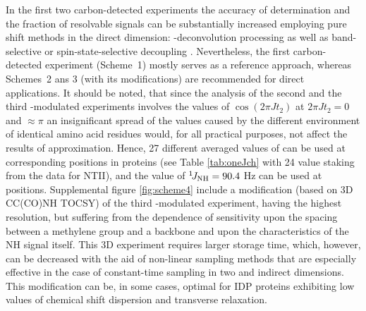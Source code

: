 \documentclass[twocolumn]{svjour3}           %
\begin{document}
In the first two carbon-detected experiments the accuracy of \gtwoCH{} determination and the fraction of resolvable signals can be substantially increased employing pure shift methods in the direct \clab{} dimension: \oneJcc-decon\-volution processing \cite{shimba_elimination_2003,kazimierczuk_non-uniform_2015} as well as band-selective or spin-state-selective decoupling \cite{zangger_pure_2015}. Nevertheless, the first carbon-detected experiment (Scheme~1) mostly serves as a reference approach, whereas Schemes~2 ans 3 (with its modifications) are recommended for direct applications. It should be noted, that since the analysis of the second and the third \oneJch-modulated 
experiments involves the values of $\cos(2\pi J t_2)$  at 
$2\pi J t_2 = 0$ and $\approx \pi$ an insignificant 
spread of the \oneJch{} values caused by the different environment of 
identical amino acid residues would, for all practical purposes, not 
affect the results of approximation. Hence, 27 different averaged 
values of \oneJch{} can be used at corresponding \CHtwo{} positions in 
proteins (see Table \ref{tab:oneJch} with 24 \oneJch{} value staking 
from the data for 
{NTII}), and the value of $^1\!J_\text{NH}{} = 90.4$ Hz can be used at \NHtwo{} 
positions. Supplemental figure \ref{fig:scheme4} include a modification 
(based on 3D {CC(CO)NH} 
{TOCSY}) of the third \oneJch-modulated experiment, having the highest 
resolution, but suffering from the dependence of sensitivity upon the 
spacing between a methylene group and a backbone and upon the 
characteristics of the {NH} signal itself. This 3D experiment requires 
larger storage time, which, however, can be decreased with the aid of 
non-linear sampling methods \cite{kazimierczuk_non-uniform_2015}
that are especially effective in the case of constant-time sampling in 
two \clab{} and \nlab{} indirect dimensions. This modification can be, 
in some cases, optimal for IDP proteins exhibiting low values of 
chemical shift dispersion and transverse relaxation. 
\end{document}
